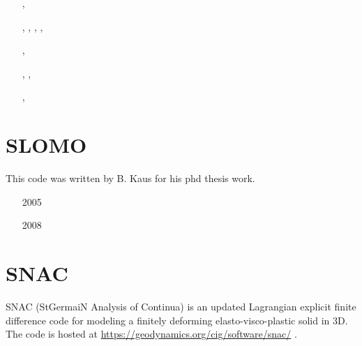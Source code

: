 \begin{small}
\begin{itemize}
\item[\twothousandeight]       \textcite{poso08}
\item[\twothousandten]         \textcite{qusp10}
\item[\twothousandtwelve]      \textcite{brps12}
\item[\twothousandthirteen]    \textcite{brps13},  \textcite{brau13}
\item[\twothousandfourteen]    \textcite{brun14},  \textcite{hebr14},  \textcite{kobf14},
                               \textcite{brhp14},  \textcite{duqo14}
\item[\twothousandfifteen]     \textcite{clbq15}
\item[\twothousandseventeen]   \textcite{brcr17},  \textcite{baso17} 
\item[\twothousandeighteen]    \textcite{basq18},  \textcite{osss18},  \textcite{osss18b}
\item[\twothousandnineteen]    \textcite{sobr19},  \textcite{stco19}
\item[\twothousandtwentyfour]  \textcite{anim24}
\end{itemize}
\end{small}


\section{SLOMO} 
This code was written by B. Kaus for his phd thesis work.

\begin{small}
\begin{itemize}
\item[2005] \textcite{kaus05}
\item[2008] \textcite{kasb08}
\end{itemize}
\end{small}

\section{SNAC} 
SNAC (StGermaiN Analysis of Continua) is an updated Lagrangian explicit finite 
difference code for modeling a finitely deforming elasto-visco-plastic solid in 3D.
The code is hosted at \url{https://geodynamics.org/cig/software/snac/} .

